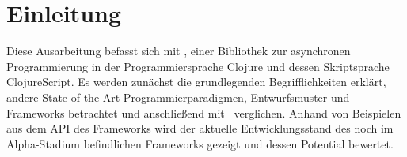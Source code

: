 \chapter{Einleitung}
Diese Ausarbeitung befasst sich mit \CA , einer Bibliothek zur asynchronen Programmierung in der Programmiersprache Clojure und dessen Skriptsprache ClojureScript. Es werden zunächst die grundlegenden Begrifflichkeiten erklärt, andere State-of-the-Art Programmierparadigmen, Entwurfsmuster und Frameworks betrachtet und anschließend mit \CA\  verglichen. Anhand von Beispielen aus dem \acf{API} des Frameworks wird der aktuelle Entwicklungsstand des noch im Alpha-Stadium befindlichen Frameworks gezeigt und dessen Potential bewertet.

\acresetall
